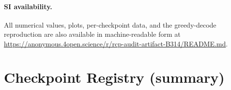 \documentclass[pdflatex,sn-chicago]{sn-jnl}
\begin{document}
\paragraph{SI availability.}
All numerical values, plots, per-checkpoint data, and the greedy-decode reproduction are also available in machine-readable form at \url{https://anonymous.4open.science/r/rcp-audit-artifact-B314/README.md}.

\label{sec:appendix_missing_id}
\label{sec:provenance}
\label{sec:appendix_decomposition}
\label{sec:appendix_config_faithful}
\label{sec:appendix_perturbation}
\label{sec:appendix_cluster_bootstrap}
\label{sec:appendix_oracle}
\label{sec:appendix_template_boundary}
\label{sec:appendix_human_eval}
\label{sec:appendix_slot}
\label{sec:appendix_extrapolation}
\label{sec:csl-daily}
\label{sec:appendix_leakage}

\section*{Checkpoint Registry (summary)}
\label{tab:path_sensitivity}
\label{tab:perturbation}
\label{tab:checkpoint_registry}
\end{document}

